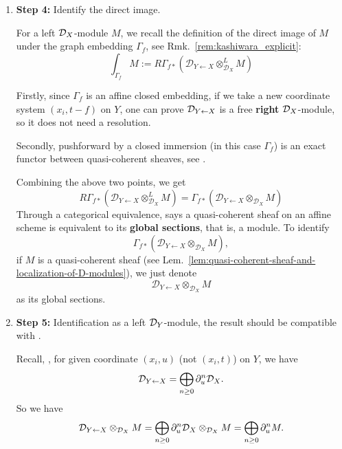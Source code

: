 \begin{example}
\begin{enumerate}
        \item \textbf{Step 4:} Identify the direct image.

              For a left $\mathcal{D}_X$-module $M$, we recall the definition of the direct image of $M$ under the graph embedding $\Gamma_f$,
              see Rmk.~\ref{rem:kashiwara_explicit}:
              \[
                  \int_{\Gamma_f} M := R\Gamma_{f*}\left(\mathcal{D}_{Y \leftarrow X} \otimes^L_{\mathcal{D}_X} M\right)
              \]

              Firstly, since $\Gamma_f$ is an affine closed embedding, if we take a new coordinate system $(x_i,t-f)$ on $Y$,
              one can prove $\mathcal{D}_{Y\leftarrow X}$ is a free \textbf{right} $\mathcal{D}_X$-module, so it does not need a resolution.

              Secondly, pushforward by a closed immersion (in this case $\Gamma_f$) is an exact functor between quasi-coherent sheaves,
              see \cite[\href{https://stacks.math.columbia.edu/tag/01AX}{Tag 01AX}]{stacks-project}.

              Combining the above two points, we get
              \[
                  R\Gamma_{f*}\left(\mathcal{D}_{Y \leftarrow X} \otimes^L_{\mathcal{D}_X} M\right) = \Gamma_{f*}\left(\mathcal{D}_{Y \leftarrow X} \otimes_{\mathcal{D}_X} M\right)
              \]
              Through a categorical equivalence, says a quasi-coherent sheaf on an affine scheme is equivalent to its \textbf{global sections}, that is, a module.
              To identify
              \[
                  \Gamma_{f*}\left(\mathcal{D}_{Y \leftarrow X} \otimes_{\mathcal{D}_X} M\right),
              \]
              if $M$ is a quasi-coherent sheaf (see Lem.~\ref{lem:quasi-coherent-sheaf-and-localization-of-D-modules}), we just denote
              \[
                  \mathcal{D}_{Y \leftarrow X} \otimes_{\mathcal{D}_X} M
              \]
              as its global sections.

        \item \textbf{Step 5:} Identification as a left $\mathcal{D}_Y$-module, the result should be compatible with \cite[discussion above Prop.~1.4]{Budur04}.

              Recall, \cite[Example~1.3.5.]{hotta2008d}, for given coordinate $(x_i, u)$ (not $(x_i, t)$) on $Y$, we have
              \[
                  \mathcal{D}_{Y \leftarrow X} = \bigoplus_{n \ge 0} \partial_u^n \mathcal{D}_X.
              \]
              So we have
              \[
                  \mathcal{D}_{Y \leftarrow X} \otimes_{\mathcal{D}_X} M = \bigoplus_{n \ge 0} \partial_u^n \mathcal{D}_X \otimes_{\mathcal{D}_X} M = \bigoplus_{n \ge 0} \partial_u^n M.
              \]


\end{enumerate}
\end{example}
